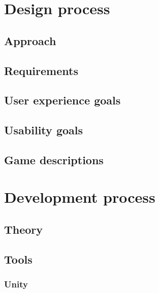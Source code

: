 \documentclass[BSP,english,oneside]{classes/gucthesis}
\begin{document}
\chapter{Design process}
	\label{chap:design_process}

	\section{Approach}
		\label{sec:approach}
		

	\section{Requirements}
		\label{sec:requirements}
		

	\section{User experience goals}
		\label{sec:user_experience_goals}
		

	\section{Usability goals}
		\label{sec:usability_goals}
		

	\section{Game descriptions}
		\label{sec:game_descriptions}
		


\chapter{Development process}
	\label{chap:development_process}

	\section{Theory}
		\label{sec:theory}
		

	\section{Tools}
		\label{sec:tools}

		\subsection{Unity}
			\label{subsec:unity}
			
\end{document}
